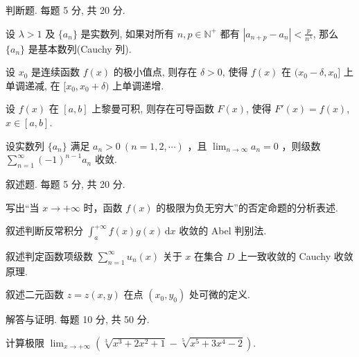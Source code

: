 \par{}
判断题. 每题 5 分, 共 20 分.\par
设 $\lambda > 1$ 及 $\{a_n\}$ 是实数列, 如果对所有 $n, p \in \mathbb{N}^+$ 都有 $|a_{n+p} - a_n| < \frac{p}{n^\lambda}$, 那么 $\{a_n\}$ 是基本数列(Cauchy 列).\par
设 $x_0$ 是连续函数 $f(x)$ 的极小值点, 则存在 $\delta > 0$, 使得 $f(x)$ 在 $(x_0 - \delta, x_0]$ 上单调递减, 在 $[x_0, x_0 + \delta)$ 上单调递增.\par
设 $f(x)$ 在 $[a, b]$ 上黎曼可积, 则存在可导函数 $F(x)$, 使得 $F'(x) = f(x)$, $x \in [a, b]$.\par
设实数列  $\{a_{n}\}$  满足  $a_{n}>0\ (n=1,2,\cdots)$ ，且  $\lim_{n\to\infty}a_{n}=0$ ，则级数  $\sum_{n=1}^{\infty}(-1)^{n-1}a_{n}$  收敛.\par
\par{}
叙述题. 每题 5 分, 共 20 分.\par
写出“当 $x \to +\infty$ 时，函数 $f(x)$ 的极限为负无穷大”的否定命题的分析表述.\par
叙述判断反常积分 $\int_{a}^{+\infty} f(x) g(x) \, \mathrm{d}x$ 收敛的 Abel 判别法.\par
叙述判定函数项级数 $\sum_{n=1}^{\infty} u_n(x)$ 关于 $x$ 在集合 $D$ 上一致收敛的 Cauchy 收敛原理.\par
叙述二元函数 $z = z(x, y)$ 在点 $(x_0, y_0)$ 处可微的定义.\par
\par{}
解答与证明. 每题 10 分, 共 50 分.\par
计算极限 $\lim_{x\to +\infty}\left(\sqrt[3]{x^3 + 2x^2 + 1} -\sqrt[5]{x^5 + 3x^4 - 2}\right).$\par
